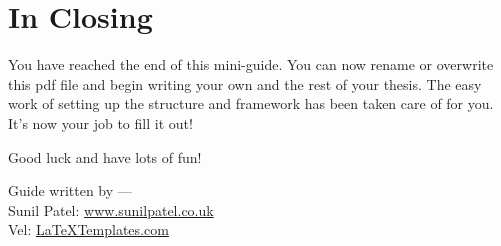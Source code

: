 \section{In Closing}

You have reached the end of this mini-guide. You can now rename or overwrite this pdf file and begin writing your own  and the rest of your thesis. The easy work of setting up the structure and framework has been taken care of for you. It's now your job to fill it out!

Good luck and have lots of fun!

\begin{flushright}
Guide written by ---\\
Sunil Patel: \href{http://www.sunilpatel.co.uk}{www.sunilpatel.co.uk}\\
Vel: \href{http://www.LaTeXTemplates.com}{LaTeXTemplates.com}
\end{flushright}
